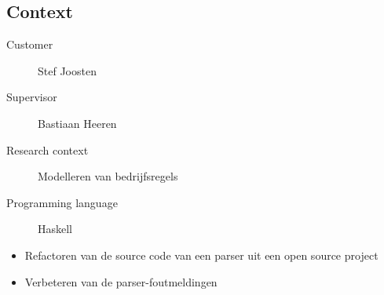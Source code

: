 
\subsection{Context}
%
\begin{description}
	\item [Customer] Stef Joosten
	\item [Supervisor] Bastiaan Heeren
	\item [Research context] Modelleren van bedrijfsregels
	\item [Programming language] Haskell
\end{description}

\begin{itemize}
	\item Refactoren van de source code van een parser uit een open source project 
	\item Verbeteren van de parser-foutmeldingen
\end{itemize}
